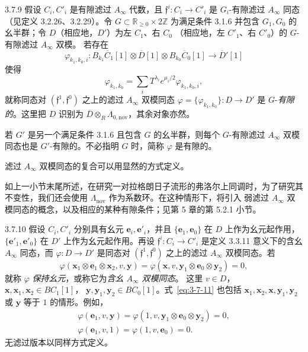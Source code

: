 \begin{definition}{3.7.9}\label{def:3-7-9}
假设 $C_i,C'_i$ 是有隙滤过 $A_\infty$ 代数，且
$\mathfrak f^i\colon C_i\to C'_i$ 是 $G_i$-有隙滤过 $A_\infty$ 同态
（见定义 3.2.26、3.2.29）。令
$G\subset\mathbb R_{\geq0}\times2\mathbb Z$ 为满足条件 3.1.6 并包含
$G_1,G_0$ 的幺半群；令 $D$（相应地，$D'$）为左 $C_1$、右 $C_0$
（相应地，左 $C'_1$、右 $C'_0$）的 $G$-有隙滤过 $A_\infty$ 双模。
若存在
\[
  \varphi_{k_1,k_0,i}\colon
  B_{k_1}\overline C_1[1]\otimes\overline D[1]
  \otimes B_{k_0}\overline C_0[1]\longrightarrow\overline D'[1]
\]
使得
\[
  \varphi_{k_1,k_0}
  =\sum_iT^{\lambda_i}e^{\mu_i/2}\varphi_{k_1,k_0,i},
\]
就称同态对 $(\mathfrak f^1,\mathfrak f^0)$ 之上的滤过 $A_\infty$ 双模同态
$\varphi=\{\varphi_{k_1,k_0}\}\colon D\to D'$ 是
$G$-\emph{有隙的}。这里把 $D$ 识别为
$\overline D\otimes_R\Lambda_{0,\mathrm{nov}}$，其余对象亦然。

若 $G'$ 是另一个满足条件 3.1.6 且包含 $G$ 的幺半群，则每个 $G$-有隙滤过
$A_\infty$ 双模同态也是 $G'$-有隙的。不必指明 $G$ 时，简称
$\varphi$ 是有隙的。
\end{definition}

滤过 $A_\infty$ 双模同态的复合可以用显然的方式定义。

如上一小节末尾所述，在研究一对拉格朗日子流形的弗洛尔上同调时，为了研究其
不变性，我们还会使用 $\Lambda_{\mathrm{nov}}$ 作为系数环。在这种情形下，将引入
弱滤过 $A_\infty$ 双模同态的概念，以及相应的某种有隙条件；见第 5 章的第
5.2.1 小节。

\begin{definition}{3.7.10}\label{def:3-7-10}
假设 $C_i,C'_i$ 分别具有幺元 $\mathbf e_i,\mathbf e'_i$，并且
$\{\mathbf e_1,\mathbf e_0\}$ 在 $D$ 上作为幺元起作用，
$\{\mathbf e'_1,\mathbf e'_0\}$ 在 $D'$ 上作为幺元起作用。再设
$\mathfrak f^i\colon C_i\to C'_i$ 是定义 3.3.11 意义下的含幺
$A_\infty$ 同态，而 $\varphi\colon D\to D'$ 是同态对
$(\mathfrak f^1,\mathfrak f^0)$ 之上的滤过 $A_\infty$ 双模同态。若
\begin{equation}
  \varphi(\mathbf x_1\otimes\mathbf e_1\otimes\mathbf x_2,v,\mathbf y)
  =\varphi(\mathbf x,v,
    \mathbf y_1\otimes\mathbf e_0\otimes\mathbf y_2)=0,
\tag{3.7.11}\label{eq:3-7-11}
\end{equation}
就称 $\varphi$ \emph{保持幺元}，或称它为\emph{含幺 $A_\infty$ 双模同态}。
这里 $v\in D$，$\mathbf x,\mathbf x_1,\mathbf x_2\in BC_1[1]$，
$\mathbf y,\mathbf y_1,\mathbf y_2\in BC_0[1]$。式~\eqref{eq:3-7-11}
也包括 $\mathbf x_1,\mathbf x_2,\mathbf x,\mathbf y_1,\mathbf y_2$ 或
$\mathbf y$ 等于 $1$ 的情形。例如，
\[
\begin{gathered}
  \varphi(\mathbf e_1,v,\mathbf y)
  =\varphi(1,v,\mathbf y_1\otimes\mathbf e_0\otimes\mathbf y_2)=0,\\
  \varphi(\mathbf e_1,v,1)=\varphi(1,v,\mathbf e_0)=0.
\end{gathered}
\]
无滤过版本以同样方式定义。
\end{definition}

